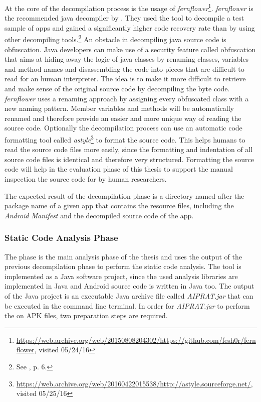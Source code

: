 At the core of the decompilation process is the usage of \textit{fernflower}\footnote{\url{https://web.archive.org/web/20150808204302/https://github.com/fesh0r/fernflower}, visited 05/24/16}.
\textit{fernflower} is the recommended java decompiler by \cite{Enck2011}. 
They used the tool to decompile a test sample of apps and gained a significantly higher code recovery rate than by using other decompiling tools.\footnote{See \cite{Enck2011}, p. 6.}
An obstacle in decompiling java source code is obfuscation. 
Java developers can make use of a security feature called obfuscation that aims at hiding away the logic of java classes by renaming classes, variables and method names and disassembling the code into pieces that are difficult to read for an human interpreter.
The idea is to make it more difficult to retrieve and make sense of the original source code by decompiling the byte code.
\textit{fernflower} uses a renaming approach by assigning every obfuscated class with a new naming pattern. 
Member variables and methods will be automatically renamed and therefore provide an easier and more unique way of reading the source code.
Optionally the decompilation process can use an automatic code formatting tool called \textit{astyle}\footnote{\url{https://web.archive.org/web/20160422015538/http://astyle.sourceforge.net/}, visited 05/25/16} to format the source code.
This helps humans to read the source code files more easily, since the formatting and indentation of all source code files is identical and therefore very structured.
Formatting the source code will help in the evaluation phase of this thesis to support the manual inspection the source code for \ipr by human researchers.

The expected result of the decompilation phase is a directory named after the package name of a given app that contains the resource files, including the \textit{Android Manifest} and the decompiled source code of the app.

\subsubsection{Static Code Analysis Phase} \label{sssec:SCAP}

The \sca phase is the main analysis phase of the thesis and uses the output of the previous decompilation phase to perform the static code analysis.
The \sca tool is implemented as a Java software project, since the used analysis libraries are implemented in Java and Android source code is written in Java too.
The output of the \sca Java project is an executable Java archive file called \textit{AIPRAT.jar} that can be executed in the command line terminal.
In order for \textit{AIPRAT.jar} to perform the \sca on APK files, two preparation steps are required.

